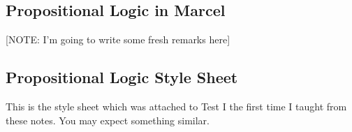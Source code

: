 \documentclass[12pt]{article}
\begin{document}
\begin{comment}
\item[Goal:]  $P \vee R$

\begin{description}

\item[Case IIa (on (3)):  assume (3a):]  $Q$

\item[Goal:]  $P \vee R$

\item[(4):]  $\perp$ by (2b)(3a) contradiction

\item[conclusion of case IIa:]  $P \vee R$ by (4) (anything follows from a contradiction)

\item[Case IIb (on (3)) assume (3b):]  $R$

\item[Goal:]  $P \vee R$

\item[conclusion of case IIb:]  $P \vee R$  by weakening from (3b) and this is our goal.



\end{description}

\end{description}
\end{description}

\end{description}

Notice the nested proofs by cases in this example.  The last homework problem has two parts similarly related -- prove using any rules, then prove using only the positive rules for disjunction.

\end{comment}

\subsection{Propositional Logic in Marcel}

[NOTE:  I'm going to write some fresh remarks here]

\subsection{Propositional Logic Style Sheet}

This is the style sheet which was attached to Test I the first time I taught from these notes.  You may expect something similar.
\end{document}
